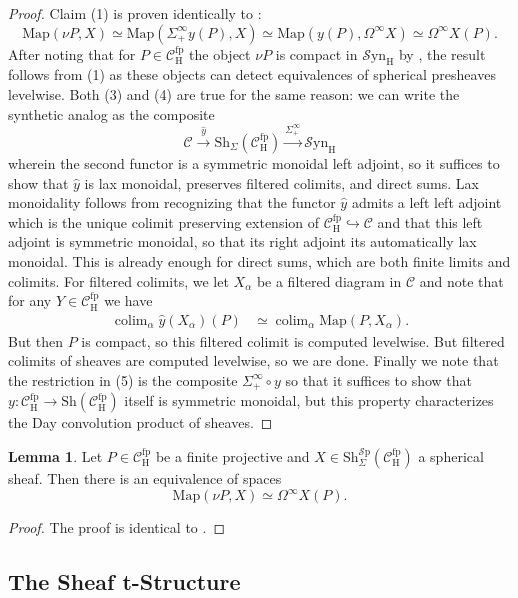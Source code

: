 \documentclass[10pt]{amsart}
\theoremstyle{definition}
\numberwithin{figure}{section}
\numberwithin{equation}{section}
\newtheorem{lemma}[figure]{Lemma}
\newcommand{\cC}{\mathcal{C}}
\theoremstyle{cited}
\newcommand{\colim}{\operatorname{colim}}
\newcommand{\Sp}{{\mathcal{S}\mathrm{p}}}
\newcommand{\Map}{\mathrm{Map}}
\newcommand{\Sh}{\mathrm{Sh}}
\newcommand{\fp}{\mathrm{fp}}
\newcommand{\Syn}{\mathcal{S}\mathrm{yn}}
\renewcommand{\H}{\mathrm{H}}
\begin{document}
\begin{proof}
  Claim (1) is proven identically to \cite[Lemma 4.11]{Pst22}:
  \[
  \Map(\nu P, X)\simeq \Map(\Sigma_+^\infty y(P), X)\simeq \Map(y(P), \Omega^\infty X)\simeq \Omega^\infty X(P).
  \]
  After noting that for $P\in \cC_\H^\fp$ the object $\nu P$ is compact in $\Syn_\H$ by \cite[Cor. 4.12]{Pst22}, the result follows from (1) as these objects can detect equivalences of spherical presheaves levelwise. Both (3) and (4) are true for the same reason: we can write the synthetic analog as the composite
  \[
  \cC\xrightarrow{\hat y} \Sh_\Sigma(\cC_\H^\fp) \xrightarrow{\Sigma_+^\infty}\Syn_\H
  \]
  wherein the second functor is a symmetric monoidal left adjoint, so it suffices to show that $\hat y$ is lax monoidal, preserves filtered colimits, and direct sums. Lax monoidality follows from recognizing that the functor $\hat y$ admits a left left adjoint which is the unique colimit preserving extension of $\cC^\fp_\H\hookrightarrow \cC$ and that this left adjoint is symmetric monoidal, so that its right adjoint its automatically lax monoidal. This is already enough for direct sums, which are both finite limits and colimits. For filtered colimits, we let $X_\alpha$ be a filtered diagram in $\cC$ and note that for any $Y\in \cC_\H^\fp$ we have
  \begin{align*}
    \colim_\alpha \hat y(X_\alpha)(P) & \simeq \colim_\alpha \Map(P, X_\alpha).
  \end{align*}
  But then $P$ is compact, so this filtered colimit is computed levelwise. But filtered colimits of sheaves are computed levelwise, so we are done. Finally we note that the restriction in (5) is the composite $\Sigma^\infty_+ \circ y$ so that it suffices to show that $y:\cC_\H^\fp\to \Sh(\cC_\H^\fp)$ itself is symmetric monoidal, but this property characterizes the Day convolution product of sheaves.
\end{proof}

\begin{lemma}\label{lem:mapoutofproj}
  Let $P\in \cC_\H^\fp$ be a finite projective and $X\in \Sh_\Sigma^\Sp(\cC_\H^\fp)$ a spherical sheaf. Then there is an equivalence of spaces
  \[
    \Map(\nu P, X)\simeq \Omega^\infty X(P).
  \]
\end{lemma}

\begin{proof}
  The proof is identical to \cite[Lem. 4.11]{Pst22}.
\end{proof}

\subsection{The Sheaf t-Structure} 
\end{document}
